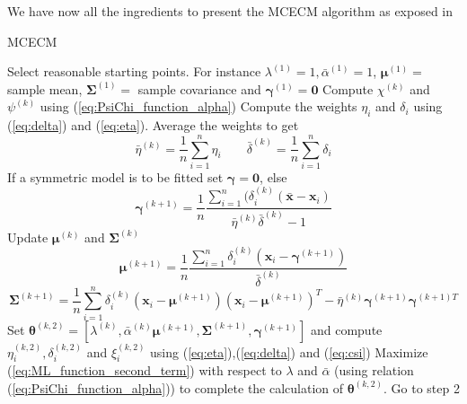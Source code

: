 We have now all the ingredients to present the MCECM algorithm as exposed in \cite{Brey2013}
\begin{algorithm}[H]
	\caption{MCECM}
	\begin{algorithmic}[1]
		\State Select reasonable starting points. For instance $\lambda^{(1)}=1,\bar{\alpha}^{(1)}=1$, $\bm{\mu}^{(1)}=$ sample mean, $\bm{\Sigma}^{(1)}=$ sample covariance and $\bm{\gamma}^{(1)} = \bm{0}$
		\State Compute $\chi^{(k)}$ and $\psi^{(k)}$ using (\ref{eq:PsiChi_function_alpha})
		\State Compute the weights $\eta_i$ and $\delta_i$ using (\ref{eq:delta}) and (\ref{eq:eta}). Average the weights to get \[ \bar{\eta}^{(k)}=\frac{1}{n}\sum_{i=1}^{n}\eta_i \quad  \quad \bar{\delta}^{(k)}=\frac{1}{n}\sum_{i=1}^{n}\delta_i \]
		\State If a symmetric model is to be fitted set $\bm{\gamma} = \bm{0}$, else \[ \bm{\gamma}^{(k+1)} = \frac{1}{n}\frac{\sum_{i=1}^{n}(\delta_i^{(k)}(\bar{\bm{x}}-\bm{x}_i)}{\bar{\eta}^{(k)}\bar{\delta}^{(k)}-1} \]
		\State Update $\bm{\mu}^{(k)}$ and $\bm{\Sigma}^{(k)}$ \[ \bm{\mu}^{(k+1)} = \frac{1}{n}\frac{\sum_{i=1}^{n}\delta_i^{(k)}(\bm{x}_i-\bm{\gamma}^{(k+1)})}{\bar{\delta}^{(k)}} \]
		\[ \bm{\Sigma}^{(k+1)}=\frac{1}{n}\sum_{i=1}^{n}\delta_i^{(k)}(\bm{x}_i-\bm{\mu}^{(k+1)})(\bm{x}_i-\bm{\mu}^{(k+1)})^T-\bar{\eta}^{(k)}\bm{\gamma}^{(k+1)} \bm{\gamma}^{(k+1)T}   \]
		\State Set $\bm{\theta}^{(k,2)}=[\lambda^{(k)},\bar{\alpha}^{(k)}\bm{\mu}^{(k+1)},\bm{\Sigma}^{(k+1)},\bm{\gamma}^{(k+1)}]$ and compute $\eta_i^{(k,2)},\delta_i^{(k,2)}$ and $\xi_i^{(k,2)}$ using (\ref{eq:eta}),(\ref{eq:delta}) and (\ref{eq:csi})
		\State Maximize (\ref{eq:ML_function_second_term}) with respect to $\lambda$ and $\bar{\alpha}$ (using relation (\ref{eq:PsiChi_function_alpha})) to complete the calculation of $\bm{\theta}^{(k,2)}$. Go to step 2
	\end{algorithmic}
\end{algorithm}




